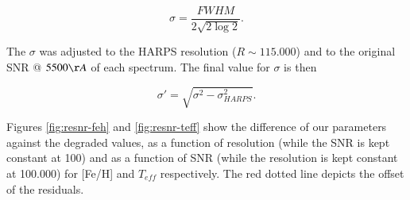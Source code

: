 \documentclass{aa}
\begin{document}
\begin{equation}
\label{eq:fwhm}
\sigma = \frac{FWHM}{2\sqrt{2\log{2}}}. 
\end{equation}

The $\sigma$ was adjusted to the HARPS resolution ($R\sim115.000$) and to the original SNR @ $5500 \AA$  of each spectrum. The final value for $\sigma$ is then





\begin{equation}
\sigma' = \sqrt{\sigma^2-\sigma_{HARPS}^2}.
\end{equation}

Figures \ref{fig:resnr-feh} and \ref{fig:resnr-teff} show the difference of our parameters against the degraded values, as a function of resolution (while the SNR is kept constant at 100) and as a function of SNR (while the resolution is kept constant at 100.000) for [Fe/H] and $T_{eff}$ respectively. The red dotted line depicts the offset of the residuals. 



\end{document}
